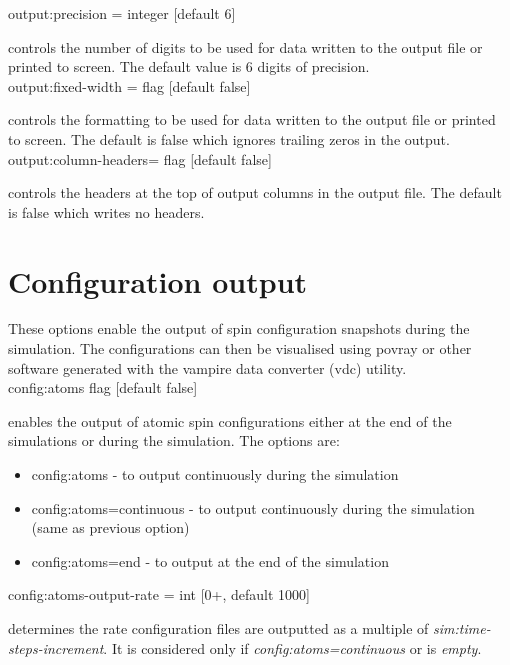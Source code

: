 {\zicf output:precision = integer [default 6]} controls
the number of digits to be used for data written to the output file or printed to screen. The default value
is 6 digits of precision. \\

{\zicf output:fixed-width = flag [default false]} controls
the formatting to be used for data written to the output file or printed to screen. The default is false which
ignores trailing zeros in the output.\\

{\zicf output:column-headers= flag [default false]} controls
the headers at the top of output columns in the output file. The default is false which writes no headers.\\

\section*{Configuration output}
These options enable the output of spin configuration snapshots during the
simulation. The configurations can then be visualised using povray or other
software generated with the vampire data converter (vdc) utility.\\

{\zicf config:atoms flag [default false]} 
enables the output of atomic spin configurations either at the end of the simulations or during the simulation. The options are:
\begin{itemize}
  \item[] config:atoms - to output continuously during the simulation
  \item[] config:atoms=continuous - to output continuously during the simulation (same as previous option)
  \item[] config:atoms=end - to output at the end of the simulation
\end{itemize}

{\zicf config:atoms-output-rate = int [0+, default 1000]}
determines the rate configuration files are outputted as a multiple of \textit{sim:time-steps-increment}. It is considered only if \textit{config:atoms=continuous} or is \textit{empty}.\\

